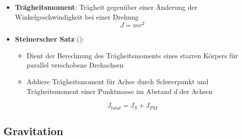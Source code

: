 \begin{itemize}
	\item \textbf{Trägheitsmoment}: Trägheit gegenüber einer Änderung der Winkelgeschwindigkeit bei einer Drehung
	\begin{equation}
		J = mr^2
	\end{equation}
	\item \textbf{Steinerscher Satz} ():
	\begin{itemize}
		\item Dient der Berechnung des Trägheitsmoments eines starren Körpers für parallel verschobene Drehachsen
		\item Addiere Trägheitsmoment für Achse durch Schwerpunkt und Trägheitsmoment einer Punktmasse im Abstand $d$ der Achsen
	\end{itemize}
	\begin{equation}
		J_{total} = J_S + J_{PM}
	\end{equation}
\end{itemize}

\newpage
\subsection{Gravitation}%
\label{mech:sub:gravitation}


